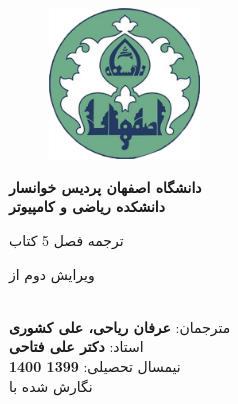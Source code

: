 \begin{center}
		\thispagestyle{empty}
		\vspace*{1cm}
		\begin{figure}
			\begin{center}
				\includegraphics[width=4cm, height=4cm]{UniversityLogo}
			\end{center}
		\end{figure}
		\vspace{-1cm}
		\Large{
			\textbf{دانشگاه اصفهان \lr{-} پردیس خوانسار \\
				دانشکده ریاضی و کامپیوتر \\
			}
		}
		\vspace{2cm}
		\LARGE{	
			ترجمه فصل 5 کتاب
			
			 \textbf{}
			 			 
			  ویرایش دوم از
		}\\
		\vspace{2cm}		
		\Large{
			مترجمان:
			\textbf{
			عرفان ریاحی، علی کشوری\\			
			}
			استاد:
			\textbf{
				دکتر علی فتاحی\\
			}
		}
		\vspace{2cm}		
		\Large{
			نیمسال تحصیلی: \textbf{1399 \lr{-} 1400}\\
			نگارش شده با \textbf{\lr{\LaTeX}}
		}
	\end{center}